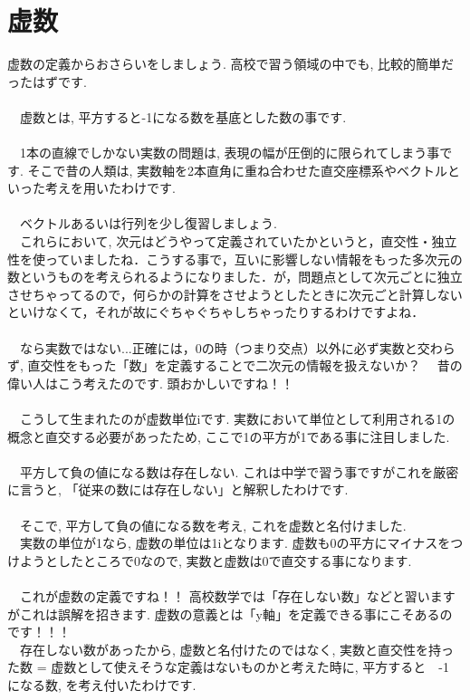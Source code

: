 \documentclass[11pt,a4paper]{ujreport}
\begin{document}
\section{虚数}
虚数の定義からおさらいをしましょう. 高校で習う領域の中でも, 比較的簡単だったはずです.\\
\\
　虚数とは, 平方すると-1になる数を基底とした数の事です.\\
\\
　1本の直線でしかない実数の問題は, 表現の幅が圧倒的に限られてしまう事です. そこで昔の人類は, 実数軸を2本直角に重ね合わせた直交座標系やベクトルといった考えを用いたわけです.\\
\\
　ベクトルあるいは行列を少し復習しましょう.\\
　これらにおいて, 次元はどうやって定義されていたかというと，直交性・独立性を使っていましたね．こうする事で，互いに影響しない情報をもった多次元の数というものを考えられるようになりました．が，問題点として次元ごとに独立させちゃってるので，何らかの計算をさせようとしたときに次元ごと計算しないといけなくて，それが故にぐちゃぐちゃしちゃったりするわけですよね．\\
\\
　なら実数ではない...正確には，0の時（つまり交点）以外に必ず実数と交わらず, 直交性をもった「数」を定義することで二次元の情報を扱えないか？
　昔の偉い人はこう考えたのです. 頭おかしいですね！！\\
\\
　こうして生まれたのが虚数単位iです. 実数において単位として利用される1の概念と直交する必要があったため, ここで1の平方が1である事に注目しました. \\
\\
　平方して負の値になる数は存在しない. これは中学で習う事ですがこれを厳密に言うと, 「従来の数には存在しない」と解釈したわけです.\\
\\
　そこで, 平方して負の値になる数を考え, これを虚数と名付けました.\\
　実数の単位が1なら, 虚数の単位は1iとなります. 虚数も0の平方にマイナスをつけようとしたところで0なので, 実数と虚数は0で直交する事になります.\\
\\
　これが虚数の定義ですね！！ 高校数学では「存在しない数」などと習いますがこれは誤解を招きます. 虚数の意義とは「y軸」を定義できる事にこそあるのです！！！\\
　存在しない数があったから, 虚数と名付けたのではなく, 実数と直交性を持った数 = 虚数として使えそうな定義はないものかと考えた時に, 平方すると　-1 になる数, を考え付いたわけです.
\end{document}

